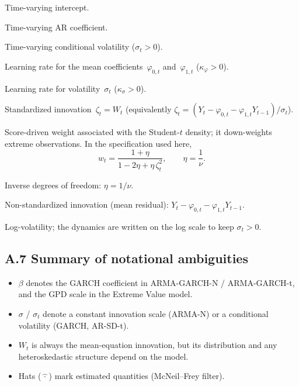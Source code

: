 \begin{description}[style=nextline,leftmargin=2.8cm,labelwidth=2.6cm]
  \item[$\varphi_{0,t}$]
    Time-varying intercept.
  \item[$\varphi_{1,t}$]
    Time-varying AR coefficient.
  \item[$\sigma_t$]
    Time-varying conditional volatility ($\sigma_t > 0$).
  \item[$\kappa_{\varphi}$]
    Learning rate for the mean coefficients~$\varphi_{0,t}$ and~$\varphi_{1,t}$
    ($\kappa_{\varphi} > 0$).
  \item[$\kappa_{\sigma}$]
    Learning rate for volatility~$\sigma_t$ ($\kappa_{\sigma} > 0$).
  \item[$\zeta_t$]
    Standardized innovation~$\zeta_t = W_t$ (equivalently $\zeta_t = (Y_t - \varphi_{0,t} - \varphi_{1,t} Y_{t-1}) / \sigma_t$).
  \item[$w_t$]
    Score-driven weight associated with the Student-$t$ density;
    it down-weights extreme observations. In the specification used here,
    \[
      w_t = \frac{1+\eta}{1 - 2\eta + \eta\,\zeta_t^2},
      \qquad \eta = \frac{1}{\nu}.
    \]
  \item[$\eta$]
    Inverse degrees of freedom: $\eta = 1/\nu$.
  \item[$\sigma_t W_t$]
    Non-standardized innovation (mean residual):
    $Y_t - \varphi_{0,t} - \varphi_{1,t} Y_{t-1}$.
  \item[$\log(\sigma_t)$]
    Log-volatility; the dynamics are written on the log scale to keep $\sigma_t > 0$.
\end{description}

\subsection*{A.7 Summary of notational ambiguities}

\begin{itemize}
  \item $\beta$ denotes the GARCH coefficient in ARMA-GARCH-N / ARMA-GARCH-t, and the GPD scale in the Extreme Value model.
  \item $\sigma$ / $\sigma_t$ denote a constant innovation scale (ARMA-N) or a conditional volatility (GARCH, AR-SD-t).
  \item $W_t$ is always the mean-equation innovation, but its distribution and any heteroskedastic structure depend on the model.
  \item Hats ($\hat{\,\cdot\,}$) mark estimated quantities (McNeil--Frey filter).
\end{itemize}

